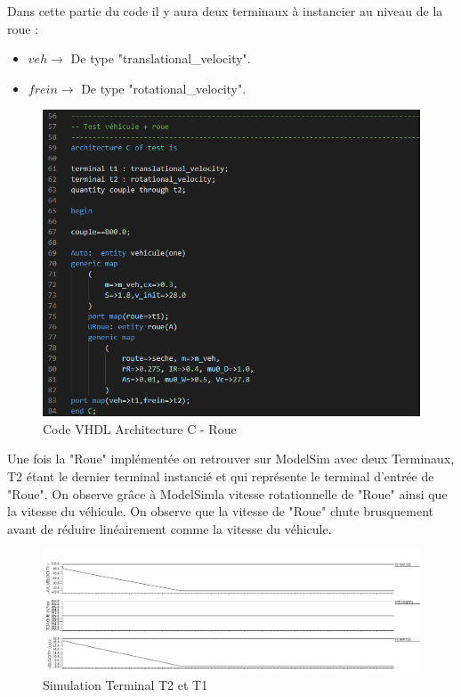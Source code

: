 Dans cette partie du code il y aura deux terminaux à instancier au niveau de la roue :\\

\begin{itemize}
    \item $veh  \rightarrow $ De type "translational\_velocity".
    \item $frein    \rightarrow $ De type "rotational\_velocity".
\end{itemize}

\begin{figure}[h]
    \centering
    \includegraphics[width=\textwidth]{images/Roue.png}
    \caption{Code VHDL Architecture C - Roue}
\end{figure}

\newpage

Une fois la "Roue" implémentée on retrouver sur ModelSim avec deux Terminaux, T2 étant le dernier terminal instancié et qui représente le terminal d'entrée de "Roue". On observe grâce à ModelSimla vitesse rotationnelle de "Roue" ainsi que la vitesse du véhicule. On observe que la vitesse de "Roue" chute brusquement avant de réduire linéairement comme la vitesse du véhicule.

\begin{figure}[h]
    \centering
    \includegraphics[width=1.1\textwidth]{images/Instanciation_roue.jpg}
    \caption{Simulation Terminal T2 et T1}
\end{figure}

